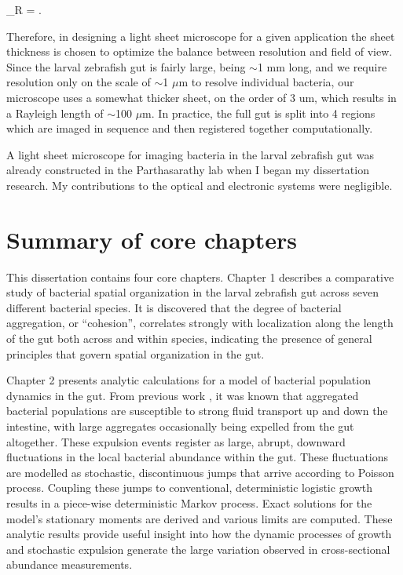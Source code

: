 \be
\ell_R = .
\ee

Therefore, in designing a light sheet microscope for a given application the sheet thickness is chosen to optimize the balance between resolution and field of view. Since the larval zebrafish gut is fairly large, being $\sim$1 mm long, and we require resolution only on the scale of $\sim$1 $\mu$m to resolve individual bacteria, our microscope uses a somewhat thicker sheet, on the order of 3 um, which results in a Rayleigh length of $\sim$100 $\mu$m. In practice, the full gut is split into 4 regions which are imaged in sequence and then registered together computationally.

A light sheet microscope for imaging bacteria in the larval zebrafish gut was already constructed in the Parthasarathy lab when I began my dissertation research. My contributions to the optical and electronic systems were negligible. 

\section{Summary of core chapters}
This dissertation contains four core chapters. Chapter 1 describes a comparative study of bacterial spatial organization in the larval zebrafish gut across seven different bacterial species. It is discovered that the degree of bacterial aggregation, or “cohesion”, correlates strongly with localization along the length of the gut both across and within species, indicating the presence of general principles that govern spatial organization in the gut. 

Chapter 2 presents analytic calculations for a model of bacterial population dynamics in the gut. From previous work \cite{wiles_host_2016}, it was known that aggregated bacterial populations are susceptible to strong fluid transport up and down the intestine, with large aggregates occasionally being expelled from the gut altogether. These expulsion events register as large, abrupt, downward fluctuations in the local bacterial abundance within the gut. These fluctuations are modelled as stochastic, discontinuous jumps that arrive according to Poisson process. Coupling these jumps to conventional, deterministic logistic growth results in a piece-wise deterministic Markov process. Exact solutions for the model's stationary moments are derived and various limits are computed. These analytic results provide useful insight into how the dynamic processes of growth and stochastic expulsion generate the large variation observed in cross-sectional abundance measurements.

